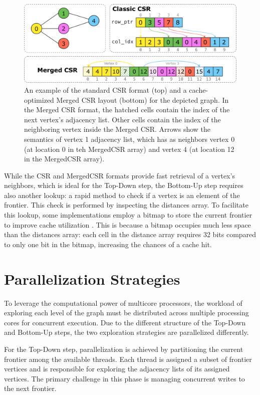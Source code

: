\begin{figure}[h]
    \centering
    \includegraphics[width=0.8\linewidth]{images/csr.png}
    \caption{An example of the standard CSR format (top) and a cache-optimized Merged CSR layout (bottom) for the depicted graph. In the Merged CSR format, the hatched cells contain the index of the next vertex's adjacency list. Other cells contain the index of the neighboring vertex inside the Merged CSR. Arrows show the semantics of vertex 1 adjacency list, which has as neighbors vertex 0 (at location 0 in teh MergedCSR array) and vertex 4 (at location 12 in the MergedCSR array). }
    \label{fig:csr}
\end{figure}

While the CSR and MergedCSR formats provide fast retrieval of a vertex's neighbors, which is ideal for the Top-Down step, the Bottom-Up step requires also another lookup: a rapid method to check if a vertex is an element of the frontier.
This check is performed by inspecting the distances array. To facilitate this lookup, some implementations employ a bitmap to store the current frontier to improve cache utilization \cite{beamer2013direction, andaloro2025cache, arai2024doubling, niu2025berrybees}. This is because a bitmap occupies much less space than the distances array: each cell in the distance array requires 32 bits compared to only one bit in the bitmap, increasing the chances of a cache hit.

\section{Parallelization Strategies}
\label{sec:strategies}
To leverage the computational power of multicore processors, the workload of exploring each level of the graph must be distributed across multiple processing cores for concurrent execution. Due to the different structure of the Top-Down and Bottom-Up steps, the two exploration strategies are parallelized differently.

For the Top-Down step, parallelization is achieved by partitioning the current frontier among the available threads. Each thread is assigned a subset of frontier vertices and is responsible for exploring the adjacency lists of its assigned vertices. The primary challenge in this phase is managing concurrent writes to the next frontier.

